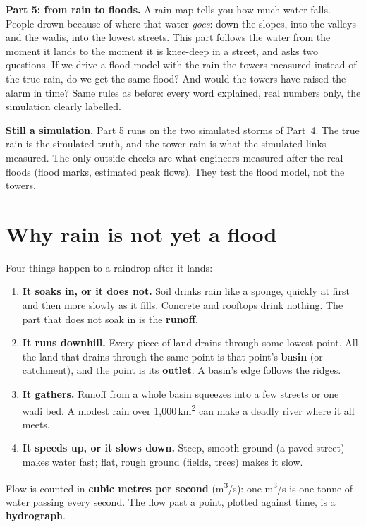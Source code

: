 \par

\clearpage
\begin{center}
\begin{minipage}{0.86\textwidth}
\small
\textbf{Part 5: from rain to floods.} A rain map tells you how much water falls. People drown because of where that water
\emph{goes}: down the slopes, into the valleys and the wadis, into the lowest streets. This part follows the water from the
moment it lands to the moment it is knee-deep in a street, and asks two questions. If we drive a flood model with the
rain the towers measured instead of the true rain, do we get the same flood? And would the towers have raised the alarm
in time? Same rules as before: every word explained, real numbers only, the simulation clearly labelled.
\end{minipage}
\end{center}

\begin{careful}
\textbf{Still a simulation.} Part 5 runs on the two simulated storms of Part~4. The true rain is the simulated truth, and
the tower rain is what the simulated links measured. The only outside checks are what engineers measured after the real
floods (flood marks, estimated peak flows). They test the flood model, not the towers.
\end{careful}

\section{Why rain is not yet a flood}
\label{sec:p5_why}
Four things happen to a raindrop after it lands:
\begin{enumerate}
\item \textbf{It soaks in, or it does not.} Soil drinks rain like a sponge, quickly at first and then more slowly as it
fills. Concrete and rooftops drink nothing. The part that does not soak in is the \textbf{runoff}.
\item \textbf{It runs downhill.} Every piece of land drains through some lowest point. All the land that drains through
the same point is that point's \textbf{basin} (or catchment), and the point is its \textbf{outlet}. A basin's edge follows
the ridges.
\item \textbf{It gathers.} Runoff from a whole basin squeezes into a few streets or one wadi bed. A modest rain over
1{,}000\,km\textsuperscript{2} can make a deadly river where it all meets.
\item \textbf{It speeds up, or it slows down.} Steep, smooth ground (a paved street) makes water fast; flat, rough ground
(fields, trees) makes it slow.
\end{enumerate}
Flow is counted in \textbf{cubic metres per second} (m\textsuperscript{3}/s): one m\textsuperscript{3}/s is one tonne of
water passing every second. The flow past a point, plotted against time, is a \textbf{hydrograph}.

